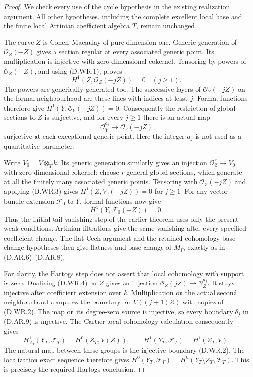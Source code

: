 \begin{proof}
We check every use of the cycle hypothesis in the existing
realization argument. All other hypotheses, including the
complete excellent local base and the finite local Artinian
coefficient algebra $T$, remain unchanged.

The curve $Z$ is Cohen--Macaulay of pure dimension one. Generic
generation of $\mathcal O_Z(-Z)$ gives a section regular at
every associated generic point. Its multiplication is injective
with zero-dimensional cokernel. Tensoring by powers of
$\mathcal O_Z(-Z)$, and using (D.WR.1), proves
\[
 H^1(Z,\mathcal O_Z(-jZ))=0\quad(j\ge1).
                                                        \tag{D.WR.3}
\]
The powers are generically generated too. The successive layers
of $\mathcal O_Y(-jZ)$ on the formal neighbourhood are these
lines with indices at least $j$. Formal functions therefore
give $H^1(Y,\mathcal O_Y(-jZ))=0$. Consequently the restriction
of global sections to $Z$ is surjective, and for every $j\ge1$
there is an actual map
\[
               \mathcal O_Y^{a_j}\longrightarrow
                                  \mathcal O_Y(-jZ)
                                                        \tag{D.WR.4}
\]
surjective at each exceptional generic point. Here the integer
$a_j$ is not used as a quantitative parameter.

Write $V_0=V\otimes_Tk$. Its generic generation similarly
gives an injection $\mathcal O_Z^r\to V_0$ with
zero-dimensional cokernel: choose $r$ general global sections,
which generate at all the finitely many associated generic
points. Tensoring with $\mathcal O_Z(-jZ)$ and applying
(D.WR.3) gives $H^1(Z,V_0(-jZ))=0$ for $j\ge1$.
For any vector-bundle extension $\mathcal F_0$ to $Y$, formal
functions now give
\[
                    H^1(Y,\mathcal F_0(-Z))=0.
                                                        \tag{D.WR.5}
\]
Thus the initial tail-vanishing step of the earlier theorem
uses only the present weak conditions. Artinian filtrations
give the same vanishing after every specified coefficient
change. The flat Cech argument and the retained cohomology
base-change hypotheses then give flatness and base change of
$M_T$, exactly as in (D.AR.6)--(D.AR.8).

For clarity, the Hartogs step does not assert that local
cohomology with support is zero. Dualizing (D.WR.4) on $Z$
gives an injection $\mathcal O_Z(jZ)\to\mathcal O_Z^{a_j}$.
It stays injective after coefficient extension over $k$.
Multiplication on the actual second neighbourhood compares
the boundary for $V((j+1)Z)$ with copies of (D.WR.2).
The map on its degree-zero source is injective, so every
boundary $\delta_j$ in (D.AR.9) is injective. The Cartier
local-cohomology calculation consequently gives
\[
 H^1_{Z_T}(Y_T,\mathcal F_T)=H^0(Z_T,V(Z)),\qquad
 H^1(Y_T,\mathcal F_T)=H^1(Z_T,V).
                                                        \tag{D.WR.6}
\]
The natural map between these groups is the injective
boundary (D.WR.2). The localization exact sequence therefore
gives $H^0(Y_T,\mathcal F_T)=H^0(Y_T\setminus Z_T,\mathcal F_T)$.
This is precisely the required Hartogs conclusion.


\end{proof}
